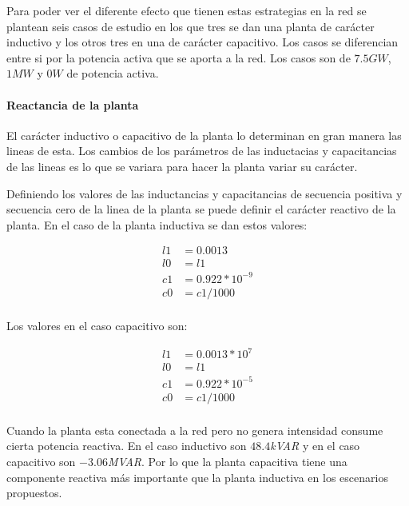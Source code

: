 \documentclass{book}
\begin{document}
Para poder ver el diferente efecto que tienen estas estrategias en la red se plantean seis casos de estudio en los que tres se dan una planta de car\'acter inductivo y los otros tres en una de car\'acter capacitivo. Los casos se diferencian entre si por la potencia activa que se aporta a la red. Los casos son de $7.5 GW$, $1MW$ y $0W$ de potencia activa.  \par

\paragraph{Reactancia de la planta}

El car\'acter inductivo o capacitivo de la planta lo determinan en gran manera las lineas de esta. Los cambios de los par\'ametros de las inductacias y capacitancias de las lineas es lo que se variara para hacer la planta variar su car\'acter. \par

Definiendo los valores de las inductancias y capacitancias de secuencia positiva y secuencia cero de la linea de la planta se puede definir el car\'acter reactivo de la planta. En el caso de la planta inductiva se dan estos valores:

\begin{equation}
\begin{split}
l1 & =0.0013 \\
l0 & =l1\\
c1 & =0.922* 10^{-9} \\
c0 & =c1/1000 \\
\end{split}
\end{equation}

Los valores en el caso capacitivo son: 

\begin{equation}
\begin{split}
l1 & =0.0013*10^{7} \\
l0 & =l1\\
c1 & =0.922*10^{-5} \\
c0 & =c1/1000 \\
\end{split}
\end{equation}

Cuando la planta esta conectada a la red pero no genera intensidad consume cierta potencia reactiva. En el caso inductivo son $48.4$\emph{kVAR} y en el caso capacitivo son $-3.06$\emph{MVAR}. Por lo que la planta capacitiva tiene una componente reactiva m\'as importante que la planta inductiva en los escenarios propuestos. \par
\end{document}
